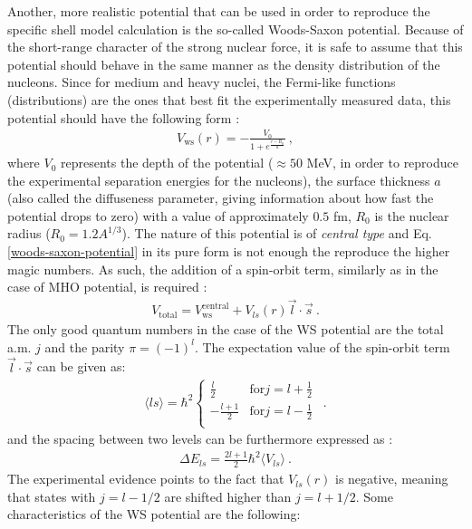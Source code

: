 Another, more realistic potential that can be used in order to reproduce the specific shell model calculation is the so-called Woods-Saxon potential. Because of the short-range character of the strong nuclear force, it is safe to assume that this potential should behave in the same manner as the density distribution of the nucleons. Since for medium and heavy nuclei, the Fermi-like functions (distributions) are the ones that best fit the experimentally measured data, this potential should have the following form \cite{woods1954diffuse}:
\begin{align}
    V_\text{ws}(r)=-\frac{V_0}{1+e^{\frac{r-R_0}{a}}}\ ,
    \label{woods-saxon-potential}
\end{align}
where $V_0$ represents the depth of the potential ($\approx 50$ MeV, in order to reproduce the experimental separation energies for the nucleons), the surface thickness $a$ (also called the diffuseness parameter, giving information about how fast the potential drops to zero) with a value of approximately $0.5$ fm, $R_0$ is the nuclear radius ($R_0=1.2A^{1/3}$). The nature of this potential is of \emph{central type} and Eq. \ref{woods-saxon-potential} in its pure form is not enough the reproduce the higher magic numbers. As such, the addition of a spin-orbit term, similarly as in the case of MHO potential, is required \cite{martin2017particle}: 
\begin{align}
    V_\text{total}=V_\text{ws}^\text{central}+V_{ls}(r)\vec{l}\cdot\vec{s}\ .
    \label{woods-saxon-so-potential}
\end{align}
The only good quantum numbers in the case of the WS potential are the total a.m. $j$ and the parity $\pi=(-1)^l$.
The expectation value of the spin-orbit term $\vec{l}\cdot\vec{s}$ can be given as:
\begin{align}
    \langle ls \rangle=\hbar^2\begin{cases}
        \frac{l}{2} \quad &\text{for} j=l+\frac{1}{2}\\
        -\frac{l+1}{2} &\text{for} j=l-\frac{1}{2}\ \\
   \end{cases}\ .
\end{align}
and the spacing between two levels can be furthermore expressed as \cite{martin2017particle}:
\begin{align}
    \Delta E_{ls}=\frac{2l+1}{2}\hbar^2\langle V_{ls}\rangle\ .
\end{align}
The experimental evidence points to the fact that $V_{ls}(r)$ is negative, meaning that states with $j=l-1/2$ are shifted higher than $j=l+1/2$. Some characteristics of the WS potential are the following:
